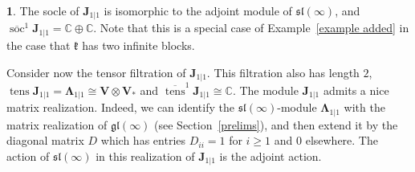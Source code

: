 \documentclass[12pt,oneside,english]{amsart}
\numberwithin{equation}{section}
\numberwithin{figure}{section}
\theoremstyle{plain}
\theoremstyle{plain}
\theoremstyle{remark}
\theoremstyle{definition}
\theoremstyle{plain}
\theoremstyle{remark}
\theoremstyle{definition}
\newtheorem{example}[thm]{\protect\examplename}
\theoremstyle{plain}
\theoremstyle{plain}
\theoremstyle{definition}
\providecommand{\examplename}{Example}
\newcommand{\bV}{\mathbf{V}}
\newcommand{\bJ}{\mathbf{J}}
\newcommand{\bW}{\mathbf{\Lambda}}
\newcommand{\soc}{\operatorname{soc}}
\newcommand{\tens}{\operatorname{tens}}
\newcommand{\fk}{\mathfrak{k}}
\begin{document}
\begin{example}

The socle of $\bJ_{1|1}$ is isomorphic to the adjoint module of $\mathfrak{sl}(\infty)$, and $\overline{\soc}^1 \bJ_{1|1}=\mathbb C\oplus\mathbb C$. Note that this is a special case of Example~\ref{example added} in the case that $\fk$ has two infinite blocks.

Consider now the tensor filtration of $\bJ_{1|1}$. This filtration also has  length $2$, $\tens \bJ_{1|1}=\bW_{1|1}\cong \bV\otimes \bV_{*}$
 and  $\overline{\tens}^1 \bJ_{1|1}\cong \mathbb C$.
The module  $\bJ_{1|1}$ admits a nice matrix realization.
Indeed, we can identify the $\mathfrak{sl}\left(\infty\right)$-module $\bW_{1|1}$ with the matrix realization of $\mathfrak{gl}(\infty)$  (see Section~\ref{prelims}), and then extend it
 by the diagonal matrix $D$ which has entries $D_{ii}=1$ for $i\geq1$ and $0$ elsewhere. The action of $\mathfrak{sl}\left(\infty\right)$ in this realization of $\bJ_{1|1}$ is the adjoint action.


\end{example}
\end{document}
